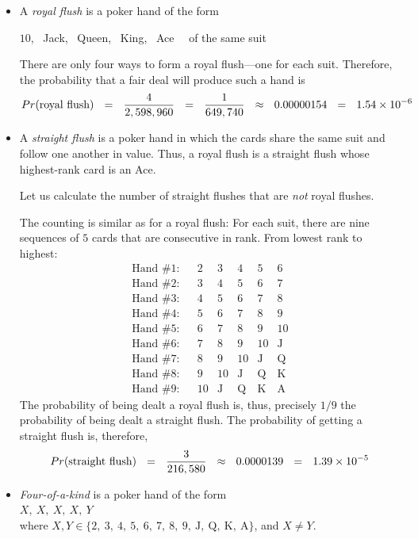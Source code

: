 \begin{itemize}
\item
A {\it royal flush} is a poker hand of the form

\hspace*{.25in}$10$, \ {\sc Jack}, \ {\sc Queen}, \ {\sc King}, \ {\sc Ace} \ \ of the same suit

\noindent
There are only four ways to form a royal flush---one for each suit.  Therefore, the probability that
a fair deal will produce such a hand is
\[ 
Pr(\mbox{royal flush}) \ \ = \ \
\frac{4}{2,598,960} \ \ = \ \ {1 \over {649,740}} \ \ \approx \ \ 0.00000154 \ \ = \ \ 1.54 \times 10^{-6} \]

\item
A {\it straight flush} is a poker hand in which the cards share the
same suit and follow one another in value.  Thus, a royal flush is a straight flush whose 
highest-rank card is an {\sc Ace}.

Let us calculate the number of straight flushes that are {\em not} royal flushes.

The counting is similar as for a royal flush:  For each suit, there are nine sequences of $5$ cards
that are consecutive in rank.  From lowest rank to highest:
\[ \begin{array}{llccccc}
\mbox{Hand \#1}: & &
2 & 3 & 4 & 5 & 6 \\
\mbox{Hand \#2}: & &
3 & 4 & 5 & 6 & 7 \\
\mbox{Hand \#3}: & &
4 & 5 & 6 & 7 & 8 \\
\mbox{Hand \#4}: & &
5 & 6 & 7 & 8 & 9 \\
\mbox{Hand \#5}: & &
6 & 7 & 8 & 9 & 10 \\
\mbox{Hand \#6}: & &
7 & 8 & 9 & 10 &  \mbox{J} \\
\mbox{Hand \#7}: & &
8 & 9 & 10 &  \mbox{J} &   \mbox{Q} \\
\mbox{Hand \#8}: & &
9 & 10 &  \mbox{J} & \mbox{Q} &  \mbox{K}  \\
\mbox{Hand \#9}: & &
10 &  \mbox{J}
     & \mbox{Q}
     & \mbox{K}
     & \mbox{A}
\end{array} \]
The probability of being dealt a royal flush is, thus, precisely $1/9$ the probability of being dealt a
straight flush.  The probability of getting a straight flush is, therefore,
\[  Pr(\mbox{straight flush}) \ \ = \ \
{3 \over {216,580}} \ \ \approx \ \ 0.0000139  \ \ = \ \ 1.39 \times 10^{-5} \]

\item
{\it Four-of-a-kind}   is a poker hand of the form \\
\hspace*{.25in}$X, \ X, \ X, \ X, \ Y$ \\
where $X, Y \in \{2, \ 3, \ 4, \ 5, \ 6, \ 7, \ 8, \ 9, \ \mbox{J}, \ \mbox{Q}, \ \mbox{K}, \ \mbox{A}\}$, 
and $X \neq Y$.


\end{itemize}
